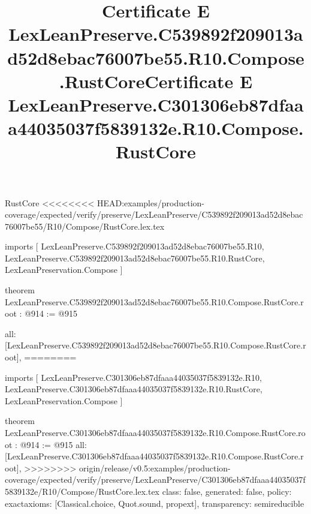 \begin{lexlean}{RustCore}
<<<<<<<< HEAD:examples/production-coverage/expected/verify/preserve/LexLeanPreserve/C539892f209013ad52d8ebac76007be55/R10/Compose/RustCore.lex.tex
\title{Certificate E LexLeanPreserve.C539892f209013ad52d8ebac76007be55.R10.Compose.RustCore}
\begin{coremodule}
imports [
  LexLeanPreserve.C539892f209013ad52d8ebac76007be55.R10,
  LexLeanPreserve.C539892f209013ad52d8ebac76007be55.R10.RustCore,
  LexLeanPreservation.Compose
]

theorem LexLeanPreserve.C539892f209013ad52d8ebac76007be55.R10.Compose.RustCore.root : @914 := @915 {
  all: [LexLeanPreserve.C539892f209013ad52d8ebac76007be55.R10.Compose.RustCore.root],
========
\title{Certificate E LexLeanPreserve.C301306eb87dfaaa44035037f5839132e.R10.Compose.RustCore}
\begin{coremodule}
imports [
  LexLeanPreserve.C301306eb87dfaaa44035037f5839132e.R10,
  LexLeanPreserve.C301306eb87dfaaa44035037f5839132e.R10.RustCore,
  LexLeanPreservation.Compose
]

theorem LexLeanPreserve.C301306eb87dfaaa44035037f5839132e.R10.Compose.RustCore.root : @914 := @915 {
  all: [LexLeanPreserve.C301306eb87dfaaa44035037f5839132e.R10.Compose.RustCore.root],
>>>>>>>> origin/release/v0.5:examples/production-coverage/expected/verify/preserve/LexLeanPreserve/C301306eb87dfaaa44035037f5839132e/R10/Compose/RustCore.lex.tex
  class: false,
  generated: false,
  policy: exact{axioms: [Classical.choice, Quot.sound, propext]},
  transparency: semireducible
}


\end{coremodule}}
\end{coremodule}
\end{lexlean}
